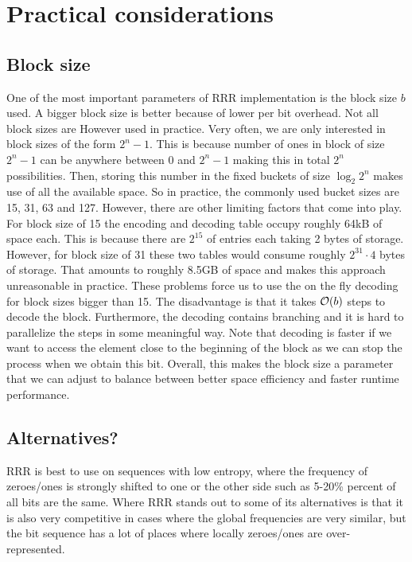 \section{Practical considerations}

\subsection{Block size}
\label{subsection:block_size}

One of the most important parameters of RRR implementation is the block
size $b$ used. A bigger block size is better because of lower per bit overhead. Not
all block sizes are However used in practice. Very often, we are only interested in
block sizes of the form $2^n-1$. This is because number of ones in block of size $2^n-1$
can be anywhere between 0 and $2^n-1$ making this in total $2^n$ possibilities. Then, storing
this number in the fixed buckets of size $\log_2 2^n$ makes use of all the available space.
So in practice, the commonly used bucket sizes are 15, 31, 63 and 127. However, there are
other limiting factors that come into play. For block size of 15 the encoding and decoding table
occupy roughly 64kB of space each. This is because there are $2^{15}$ of entries each taking
2 bytes of storage. However, for block size of 31 these two tables would consume roughly
$2^{31}\cdot 4$ bytes of storage. That amounts to roughly 8.5GB of space and makes this approach
unreasonable in practice. These problems force us to use the on the fly decoding for block sizes
bigger than 15. The disadvantage is that it takes $\mathcal{O}(b)$ steps to decode the block. Furthermore,
the decoding contains branching and it is hard to parallelize the steps in some meaningful way.
Note that decoding is faster if we want to access the element close to the beginning of
the block as we can stop the process when we obtain this bit. Overall, this makes the block
size a parameter that we can adjust to balance between better space efficiency and faster
runtime performance.


\subsection{Alternatives?}

RRR is best to use on sequences with low entropy, where the frequency of zeroes/ones is
strongly shifted to one or the other side such as 5-20\% percent of all bits are the same.
Where RRR stands out to some of its alternatives is that it is also very competitive in
cases where the global frequencies are very similar, but the bit sequence has a lot of places
where locally zeroes/ones are over-represented.

